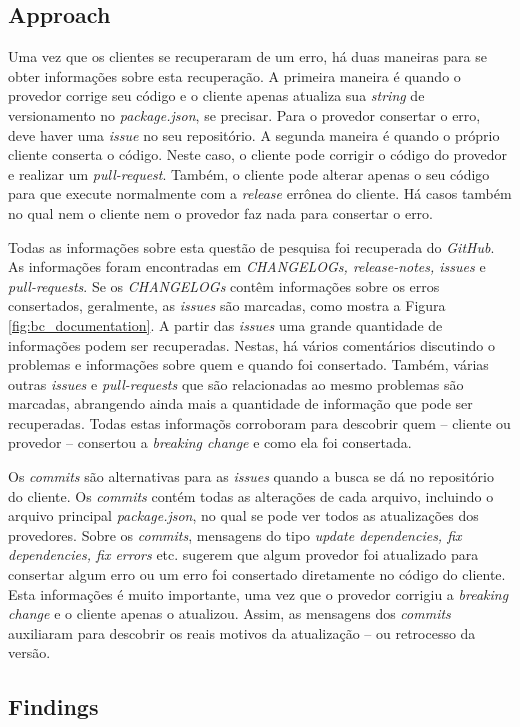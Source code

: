 \subsection{Approach}
\label{apr:rq3}

Uma vez que os clientes se recuperaram de um erro, há duas maneiras para se obter informações sobre esta recuperação. A primeira maneira é quando o provedor corrige seu código e o cliente apenas atualiza sua \textit{string} de versionamento no \textit{package.json}, se precisar. Para o provedor consertar o erro, deve haver uma \textit{issue} no seu repositório. A segunda maneira é quando o próprio cliente conserta o código. Neste caso, o cliente pode corrigir o código do provedor e realizar um \textit{pull-request}. Também, o cliente pode alterar apenas o seu código para que execute normalmente com a \textit{release} errônea do cliente. Há casos também no qual nem o cliente nem o provedor faz nada para consertar o erro.

Todas as informações sobre esta questão de pesquisa foi recuperada do \textit{GitHub}. As informações foram encontradas em \textit{CHANGELOGs, release-notes, issues} e \textit{pull-requests}. Se os \textit{CHANGELOGs} contêm informações sobre os erros consertados, geralmente, as \textit{issues} são marcadas, como mostra a Figura \ref{fig:bc_documentation}. A partir das \textit{issues} uma grande quantidade de informações podem ser recuperadas. Nestas, há vários comentários discutindo o problemas e informações sobre quem e quando foi consertado. Também, várias outras \textit{issues} e \textit{pull-requests} que são relacionadas ao mesmo problemas são marcadas, abrangendo ainda mais a quantidade de informação que pode ser recuperadas. Todas estas informaçõs corroboram para descobrir quem -- cliente ou provedor -- consertou a \textit{breaking change} e como ela foi consertada.

Os \textit{commits} são alternativas para as \textit{issues} quando a busca se dá no repositório do cliente. Os \textit{commits} contém todas as alterações de cada arquivo, incluindo o arquivo principal \textit{package.json}, no qual se pode ver todos as atualizações dos provedores. Sobre os \textit{commits}, mensagens do tipo \textit{update dependencies, fix dependencies, fix errors} etc. sugerem que algum provedor foi atualizado para consertar algum erro ou um erro foi consertado diretamente no código do cliente. Esta informações é muito importante, uma vez que o provedor corrigiu a \textit{breaking change} e o cliente apenas o atualizou. Assim, as mensagens dos \textit{commits} auxiliaram para descobrir os reais motivos da atualização -- ou retrocesso da versão.

\subsection{Findings}
\label{fin:rq3}
